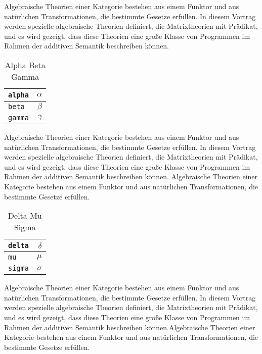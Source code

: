Algebraische Theorien einer Kategorie bestehen aus einem Funktor und
aus natürlichen Transformationen, die bestimmte Gesetze erfüllen. In
diesem Vortrag werden spezielle algebraische Theorien definiert, die
Matrixtheorien mit Prädikat, und es wird gezeigt, dass diese Theorien
eine große Klasse von Programmen im Rahmen der additiven Semantik
beschreiben können.

\begin{table}[htpb]
\begin{center}
\begin{tabular}{|l|r|}\hline
\texttt{alpha} & $\alpha$ \\\hline
\texttt{beta}  & $\beta$  \\\hline
\texttt{gamma} & $\gamma$ \\\hline
\end{tabular}
\end{center}
\caption{Alpha Beta Gamma}
\end{table}

Algebraische Theorien einer Kategorie bestehen aus einem Funktor und
aus natürlichen Transformationen, die bestimmte Gesetze erfüllen. In
diesem Vortrag werden spezielle algebraische Theorien definiert, die
Matrixtheorien mit Prädikat, und es wird gezeigt, dass diese Theorien
eine große Klasse von Programmen im Rahmen der additiven Semantik
beschreiben können. Algebraische Theorien einer Kategorie bestehen
aus einem Funktor und aus natürlichen Transformationen, die bestimmte
Gesetze erfüllen.

\begin{table}[htpb]
\begin{center}
\begin{tabular}{|l|r|}\hline
\texttt{delta} & $\delta$ \\\hline
\texttt{mu}    & $\mu$    \\\hline
\texttt{sigma} & $\sigma$ \\\hline
\end{tabular}
\caption{Delta Mu Sigma}
\end{center}
\end{table}

Algebraische Theorien einer Kategorie bestehen aus einem Funktor und
aus natürlichen Transformationen, die bestimmte Gesetze erfüllen. In
diesem Vortrag werden spezielle algebraische Theorien definiert, die
Matrixtheorien mit Prädikat, und es wird gezeigt, dass diese Theorien
eine große Klasse von Programmen im Rahmen der additiven Semantik
beschreiben können.\algtheorie\begriff Algebraische Theorien einer
Kategorie bestehen aus einem Funktor und aus natürlichen Transformationen,
die bestimmte Gesetze erfüllen.\algebra\topologie\geometrie
\zahlentheorie\stochastik\analysis\software\algorithmen
\netze\theorie\linear\logik\programmieren
\aumlaut\oumlaut\uumlaut

